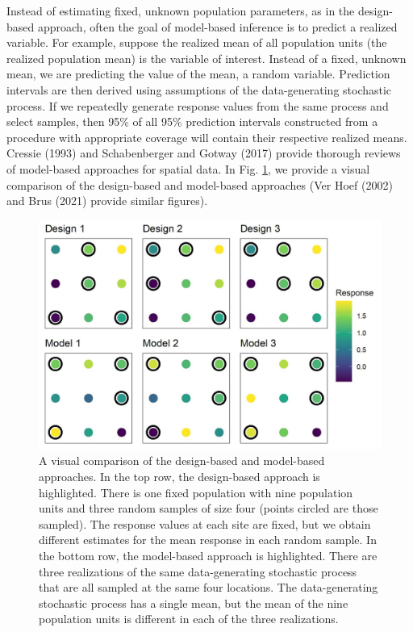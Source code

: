 \documentclass[]{elsarticle} %
\begin{document}
Instead of estimating fixed, unknown population parameters, as in the
design-based approach, often the goal of model-based inference is to
predict a realized variable. For example, suppose the realized mean of
all population units (the realized population mean) is the variable of
interest. Instead of a fixed, unknown mean, we are predicting the value
of the mean, a random variable. Prediction intervals are then derived
using assumptions of the data-generating stochastic process. If we
repeatedly generate response values from the same process and select
samples, then 95\% of all 95\% prediction intervals constructed from a
procedure with appropriate coverage will contain their respective
realized means. Cressie (1993) and Schabenberger and Gotway (2017)
provide thorough reviews of model-based approaches for spatial data. In
Fig. \ref{fig:fig1}, we provide a visual comparison of the design-based
and model-based approaches (Ver Hoef (2002) and Brus (2021) provide
similar figures).

\begin{figure}
  \centering
  \includegraphics[width = 1\linewidth]{figures/dvm_comp.jpeg}
  \caption{A visual comparison of the design-based and model-based approaches. In the top row, the design-based approach is highlighted. There is one fixed population with nine population units and three random samples of size four (points circled are those sampled). The response values at each site are fixed, but we obtain different estimates for the mean response in each random sample. In the bottom row, the model-based approach is highlighted. There are three realizations of the same data-generating stochastic process that are all sampled at the same four locations. The data-generating stochastic process has a single mean, but the mean of the nine population units is different in each of the three realizations.}
  \label{fig:fig1}
\end{figure}
\end{document}
